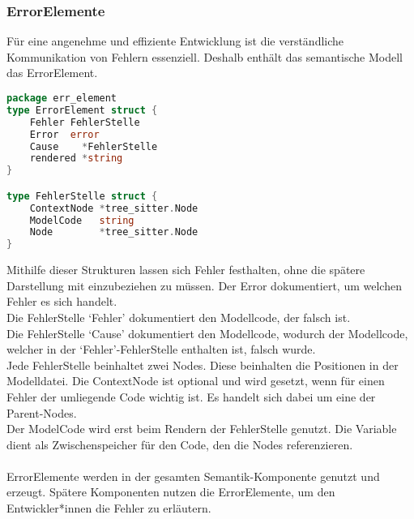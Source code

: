 \documentclass[./einleitung.tex]{subfiles}
\begin{document}
    \subsubsection{ErrorElemente}
    Für eine angenehme und effiziente Entwicklung ist die verständliche Kommunikation von Fehlern essenziell.
    Deshalb enthält das semantische Modell das ErrorElement.
    \begin{lstlisting}[language=go]
package err_element
type ErrorElement struct {
	Fehler FehlerStelle
	Error  error
	Cause    *FehlerStelle
	rendered *string
}

type FehlerStelle struct {
	ContextNode *tree_sitter.Node
	ModelCode   string
	Node        *tree_sitter.Node
}
    \end{lstlisting}
    Mithilfe dieser Strukturen lassen sich Fehler festhalten, ohne die spätere Darstellung mit einzubeziehen zu müssen.
    Der Error dokumentiert, um welchen Fehler es sich handelt. \\
    Die FehlerStelle `Fehler' dokumentiert den Modellcode, der falsch ist. \\
    Die FehlerStelle `Cause' dokumentiert den Modellcode, wodurch der Modellcode, welcher in der `Fehler'-FehlerStelle enthalten ist, falsch wurde. \\
    Jede FehlerStelle beinhaltet zwei Nodes.
    Diese beinhalten die Positionen in der Modelldatei.
    Die ContextNode ist optional und wird gesetzt, wenn für einen Fehler der umliegende Code wichtig ist.
    Es handelt sich dabei um eine der Parent-Nodes. \\
    Der ModelCode wird erst beim Rendern der FehlerStelle genutzt.
    Die Variable dient als Zwischenspeicher für den Code, den die Nodes referenzieren. \\ \\
    ErrorElemente werden in der gesamten Semantik-Komponente genutzt und erzeugt.
    Spätere Komponenten nutzen die ErrorElemente, um den Entwickler*innen die Fehler zu erläutern.
\end{document}

